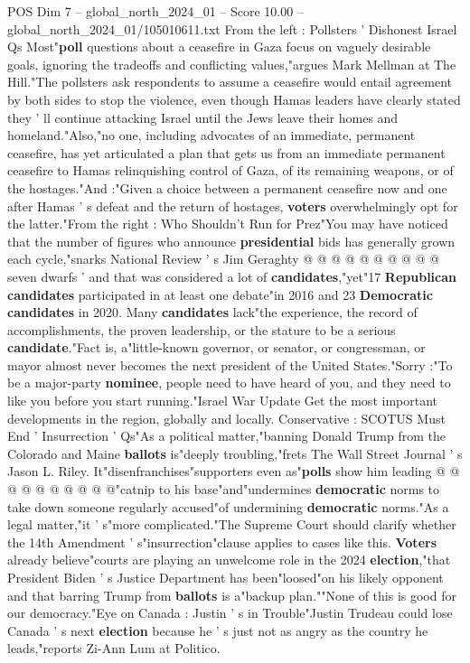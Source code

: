 \begin{textsample}{POS Dim 7 – global\_north\_2024\_01 – Score 10.00 – global\_north\_2024\_01/105010611.txt}  \label{ex:f7_pos_189}
From the left : Pollsters ' Dishonest Israel Qs Most"\textbf{poll} questions about a ceasefire in Gaza focus on vaguely desirable goals, ignoring the tradeoffs and conflicting values,"argues Mark Mellman at The Hill."The pollsters ask respondents to assume a ceasefire would entail agreement by both sides to stop the violence, even though Hamas leaders have clearly stated they ' ll continue attacking Israel until the Jews leave their homes and homeland."Also,"no one, including advocates of an immediate, permanent ceasefire, has yet articulated a plan that gets us from an immediate permanent ceasefire to Hamas relinquishing control of Gaza, of its remaining weapons, or of the hostages."And :"Given a choice between a permanent ceasefire now and one after Hamas ' s defeat and the return of hostages, \textbf{voters} overwhelmingly opt for the latter."From the right : Who Shouldn't Run for Prez"You may have noticed that the number of figures who announce \textbf{presidential} bids has generally grown each cycle,"snarks National Review ' s Jim Geraghty @ @ @ @ @ @ @ @ @ @ seven dwarfs ' and that was considered a lot of \textbf{candidates},"yet"17 \textbf{Republican} \textbf{candidates} participated in at least one debate"in 2016 and 23 \textbf{Democratic} \textbf{candidates} in 2020.
Many \textbf{candidates} lack"the experience, the record of accomplishments, the proven leadership, or the stature to be a serious \textbf{candidate}."Fact is, a"little-known governor, or senator, or congressman, or mayor almost never becomes the next president of the United States."Sorry :"To be a major-party \textbf{nominee}, people need to have heard of you, and they need to like you before you start running."Israel War Update Get the most important developments in the region, globally and locally.
Conservative : SCOTUS Must End ' Insurrection ' Qs"As a political matter,"banning Donald Trump from the Colorado and Maine \textbf{ballots} is"deeply troubling,"frets The Wall Street Journal ' s Jason L.
Riley.
It"disenfranchises"supporters even as"\textbf{polls} show him leading @ @ @ @ @ @ @ @ @ @"catnip to his base"and"undermines \textbf{democratic} norms to take down someone regularly accused"of undermining \textbf{democratic} norms."As a legal matter,"it ' s"more complicated."The Supreme Court should clarify whether the 14th Amendment ' s"insurrection"clause applies to cases like this. \textbf{Voters} already believe"courts are playing an unwelcome role in the 2024 \textbf{election},"that President Biden ' s Justice Department has been"loosed"on his likely opponent and that barring Trump from \textbf{ballots} is a"backup plan.""None of this is good for our democracy."Eye on Canada : Justin ' s in Trouble"Justin Trudeau could lose Canada ' s next \textbf{election} because he ' s just not as angry as the country he leads,"reports Zi-Ann Lum at Politico.

\end{textsample}
